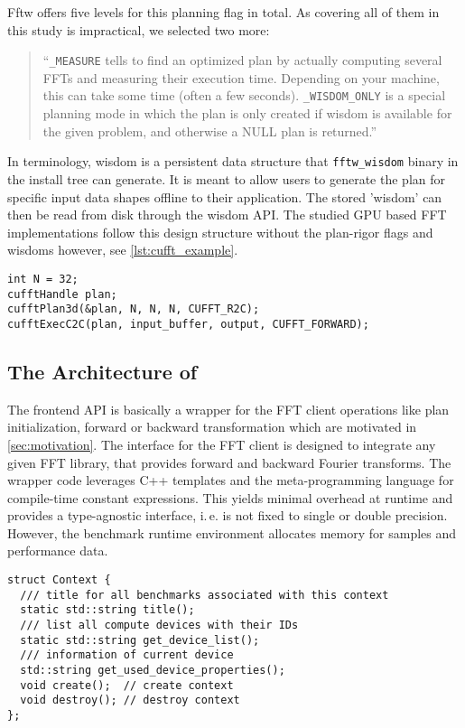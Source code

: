%
Fftw offers five levels for this planning flag in total. As covering all of them in this study is impractical, we selected two more:
\begin{quote}
``\texttt{\fftw{}\_MEASURE} tells \fftw{} to find an optimized plan by actually computing several FFTs and measuring their execution time. Depending on your machine, this can take some time (often a few seconds).\newline
\texttt{\fftw{}\_WISDOM\_ONLY} is a special planning mode in which the plan is only created if wisdom is available for the given problem, and otherwise a NULL plan is returned.''
\end{quote}
%
In \fftw{} terminology, wisdom is a persistent data structure that \texttt{fftw\_wisdom} binary in the \fftw{} install tree can generate. It is meant to allow users to generate the plan for specific input data shapes offline to their application. The stored 'wisdom' can then be read from disk through the \fftw{} wisdom API.
The studied GPU based FFT implementations follow this design structure without the plan-rigor flags and wisdoms however, see \cref{lst:cufft_example}.
\begin{lstlisting}[caption={Minimal usage example of the \cufft{} single precision real-to-complex planner API. Memory management is omitted.},label={lst:cufft_example}]
int N = 32;
cufftHandle plan;
cufftPlan3d(&plan, N, N, N, CUFFT_R2C);
cufftExecC2C(plan, input_buffer, output, CUFFT_FORWARD);
\end{lstlisting}
%
\subsection{The Architecture of \gearshifft{}}
\label{ssec:gearshifft_arch}

The frontend API is basically a wrapper for the FFT client operations like plan initialization, forward or backward transformation which are motivated in \cref{sec:motivation}.
The interface for the FFT client is designed to integrate any given FFT library, that provides forward and backward Fourier transforms.
The wrapper code leverages C++ templates and the meta-programming language for compile-time constant expressions.
This yields minimal overhead at runtime and provides a type-agnostic interface, i.\,e. \gearshifft{} is not fixed to single or double precision.
However, the benchmark runtime environment allocates memory for samples and performance data.

\begin{lstlisting}[caption={Context class required by gearshifft frontend API},label={lst:implcontext}]
struct Context {
  /// title for all benchmarks associated with this context
  static std::string title();
  /// list all compute devices with their IDs
  static std::string get_device_list();
  /// information of current device
  std::string get_used_device_properties();
  void create();  // create context
  void destroy(); // destroy context
};
\end{lstlisting}

